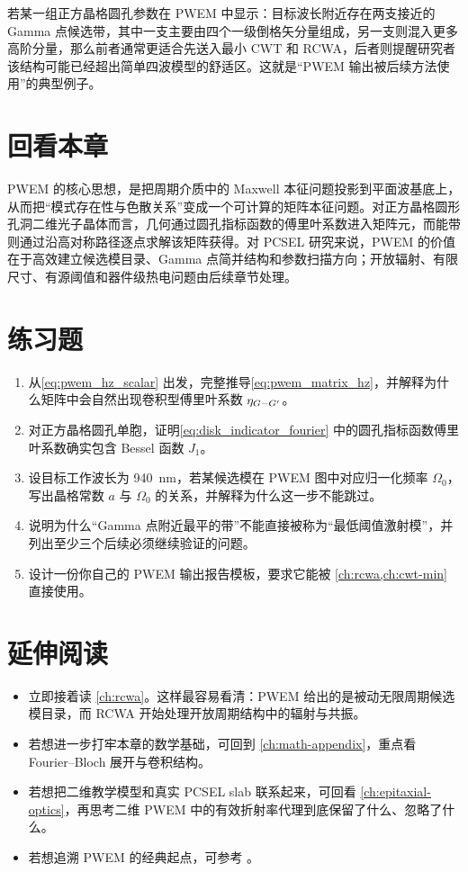 若某一组正方晶格圆孔参数在 PWEM 中显示：目标波长附近存在两支接近的 Gamma 点候选带，其中一支主要由四个一级倒格矢分量组成，另一支则混入更多高阶分量，那么前者通常更适合先送入最小 CWT 和 RCWA，后者则提醒研究者该结构可能已经超出简单四波模型的舒适区。这就是“PWEM 输出被后续方法使用”的典型例子。

\section*{回看本章}
PWEM 的核心思想，是把周期介质中的 Maxwell 本征问题投影到平面波基底上，从而把“模式存在性与色散关系”变成一个可计算的矩阵本征问题。对正方晶格圆形孔洞二维光子晶体而言，几何通过圆孔指标函数的傅里叶系数进入矩阵元，而能带则通过沿高对称路径逐点求解该矩阵获得。对 PCSEL 研究来说，PWEM 的价值在于高效建立候选模目录、Gamma 点简并结构和参数扫描方向；开放辐射、有限尺寸、有源阈值和器件级热电问题由后续章节处理。

\section*{练习题}
\begin{enumerate}
  \item \basicq 从\cref{eq:pwem_hz_scalar} 出发，完整推导\cref{eq:pwem_matrix_hz}，并解释为什么矩阵中会自然出现卷积型傅里叶系数 $\eta_{G-G'}$。

  \item \basicq 对正方晶格圆孔单胞，证明\cref{eq:disk_indicator_fourier} 中的圆孔指标函数傅里叶系数确实包含 Bessel 函数 $J_1$。

  \item \midq 设目标工作波长为 \SI{940}{nm}，若某候选模在 PWEM 图中对应归一化频率 $\Omega_0$，写出晶格常数 $a$ 与 $\Omega_0$ 的关系，并解释为什么这一步不能跳过。

  \item \midq 说明为什么“Gamma 点附近最平的带”不能直接被称为“最低阈值激射模”，并列出至少三个后续必须继续验证的问题。

  \item \hardq 设计一份你自己的 PWEM 输出报告模板，要求它能被 \cref{ch:rcwa,ch:cwt-min} 直接使用。
\end{enumerate}

\section*{延伸阅读}
\begin{itemize}
  \item 立即接着读 \cref{ch:rcwa}。这样最容易看清：PWEM 给出的是被动无限周期候选模目录，而 RCWA 开始处理开放周期结构中的辐射与共振。

  \item 若想进一步打牢本章的数学基础，可回到 \cref{ch:math-appendix}，重点看 Fourier--Bloch 展开与卷积结构。

  \item 若想把二维教学模型和真实 PCSEL slab 联系起来，可回看 \cref{ch:epitaxial-optics}，再思考二维 PWEM 中的有效折射率代理到底保留了什么、忽略了什么。

  \item 若想追溯 PWEM 的经典起点，可参考 \cite{ho1990,leung1990,johnson2001}。
\end{itemize}
